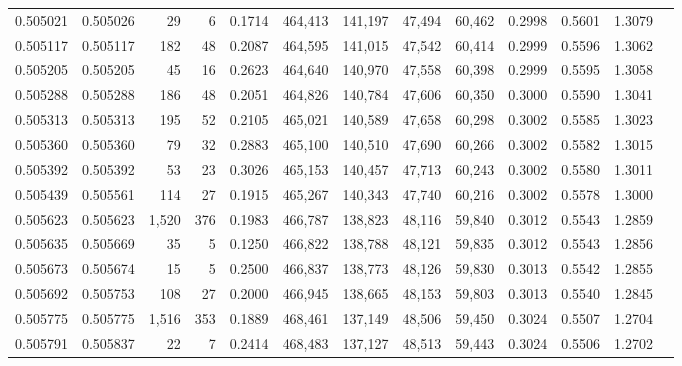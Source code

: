 \begin{tabular}{rrrrrrrrrrrrr}
0.505021 & 0.505026 &    29 &     6 &                                     0.1714 & 464,413 & 141,197 &  47,494 &  60,462 & 0.2998 & 0.5601 & 1.3079 \\
0.505117 & 0.505117 &   182 &    48 &                                     0.2087 & 464,595 & 141,015 &  47,542 &  60,414 & 0.2999 & 0.5596 & 1.3062 \\
0.505205 & 0.505205 &    45 &    16 &                                     0.2623 & 464,640 & 140,970 &  47,558 &  60,398 & 0.2999 & 0.5595 & 1.3058 \\
0.505288 & 0.505288 &   186 &    48 &                                     0.2051 & 464,826 & 140,784 &  47,606 &  60,350 & 0.3000 & 0.5590 & 1.3041 \\
0.505313 & 0.505313 &   195 &    52 &                                     0.2105 & 465,021 & 140,589 &  47,658 &  60,298 & 0.3002 & 0.5585 & 1.3023 \\
0.505360 & 0.505360 &    79 &    32 &                                     0.2883 & 465,100 & 140,510 &  47,690 &  60,266 & 0.3002 & 0.5582 & 1.3015 \\
0.505392 & 0.505392 &    53 &    23 &                                     0.3026 & 465,153 & 140,457 &  47,713 &  60,243 & 0.3002 & 0.5580 & 1.3011 \\
0.505439 & 0.505561 &   114 &    27 &                                     0.1915 & 465,267 & 140,343 &  47,740 &  60,216 & 0.3002 & 0.5578 & 1.3000 \\
0.505623 & 0.505623 & 1,520 &   376 &                                     0.1983 & 466,787 & 138,823 &  48,116 &  59,840 & 0.3012 & 0.5543 & 1.2859 \\
0.505635 & 0.505669 &    35 &     5 &                                     0.1250 & 466,822 & 138,788 &  48,121 &  59,835 & 0.3012 & 0.5543 & 1.2856 \\
0.505673 & 0.505674 &    15 &     5 &                                     0.2500 & 466,837 & 138,773 &  48,126 &  59,830 & 0.3013 & 0.5542 & 1.2855 \\
0.505692 & 0.505753 &   108 &    27 &                                     0.2000 & 466,945 & 138,665 &  48,153 &  59,803 & 0.3013 & 0.5540 & 1.2845 \\
0.505775 & 0.505775 & 1,516 &   353 &                                     0.1889 & 468,461 & 137,149 &  48,506 &  59,450 & 0.3024 & 0.5507 & 1.2704 \\
0.505791 & 0.505837 &    22 &     7 &                                     0.2414 & 468,483 & 137,127 &  48,513 &  59,443 & 0.3024 & 0.5506 & 1.2702 \\

\end{tabular}
